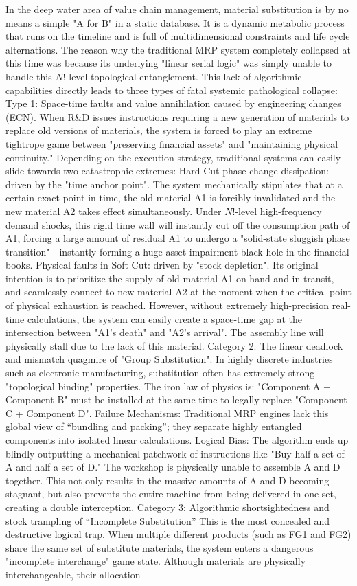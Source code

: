 \documentclass[11pt,a4paper]{article}
\begin{document}
In the deep water area of value chain management, material substitution is by no means a simple "A for B" in a static database. It is a dynamic metabolic process that runs on the timeline and is full of multidimensional constraints and life cycle alternations. The reason why the traditional MRP system completely collapsed at this time was because its underlying "linear serial logic" was simply unable to handle this $N!$-level topological entanglement. This lack of algorithmic capabilities directly leads to three types of fatal systemic pathological collapse: Type 1: Space-time faults and value annihilation caused by engineering changes (ECN). When R\&D issues instructions requiring a new generation of materials to replace old versions of materials, the system is forced to play an extreme tightrope game between "preserving financial assets" and "maintaining physical continuity." Depending on the execution strategy, traditional systems can easily slide towards two catastrophic extremes: Hard Cut phase change dissipation: driven by the "time anchor point". The system mechanically stipulates that at a certain exact point in time, the old material A1 is forcibly invalidated and the new material A2 takes effect simultaneously. Under $N!$-level high-frequency demand shocks, this rigid time wall will instantly cut off the consumption path of A1, forcing a large amount of residual A1 to undergo a "solid-state sluggish phase transition" - instantly forming a huge asset impairment black hole in the financial books. Physical faults in Soft Cut: driven by "stock depletion". Its original intention is to prioritize the supply of old material A1 on hand and in transit, and seamlessly connect to new material A2 at the moment when the critical point of physical exhaustion is reached. However, without extremely high-precision real-time calculations, the system can easily create a space-time gap at the intersection between "A1's death" and "A2's arrival". The assembly line will physically stall due to the lack of this material. Category 2: The linear deadlock and mismatch quagmire of "Group Substitution". In highly discrete industries such as electronic manufacturing, substitution often has extremely strong "topological binding" properties. The iron law of physics is: "Component A + Component B" must be installed at the same time to legally replace "Component C + Component D". Failure Mechanisms: Traditional MRP engines lack this global view of “bundling and packing”; they separate highly entangled components into isolated linear calculations. Logical Bias: The algorithm ends up blindly outputting a mechanical patchwork of instructions like "Buy half a set of A and half a set of D." The workshop is physically unable to assemble A and D together. This not only results in the massive amounts of A and D becoming stagnant, but also prevents the entire machine from being delivered in one set, creating a double interception. Category 3: Algorithmic shortsightedness and stock trampling of “Incomplete Substitution” This is the most concealed and destructive logical trap. When multiple different products (such as FG1 and FG2) share the same set of substitute materials, the system enters a dangerous "incomplete interchange" game state. Although materials are physically interchangeable, their allocation 
\end{document}
